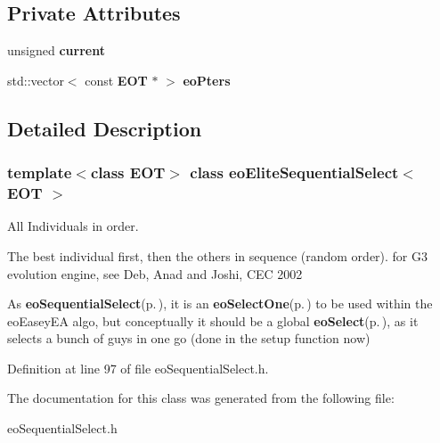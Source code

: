 \subsection*{Private Attributes}
\begin{CompactItemize}
\item 
unsigned {\bf current}\label{classeo_elite_sequential_select_r0}

\item 
std::vector$<$ const {\bf EOT} $\ast$ $>$ {\bf eo\-Pters}\label{classeo_elite_sequential_select_r1}

\end{CompactItemize}


\subsection{Detailed Description}
\subsubsection*{template$<$class EOT$>$ class eo\-Elite\-Sequential\-Select$<$ EOT $>$}

All Individuals in order. 

The best individual first, then the others in sequence (random order). for G3 evolution engine, see Deb, Anad and Joshi, CEC 2002

As {\bf eo\-Sequential\-Select}{\rm (p.\,\pageref{classeo_sequential_select})}, it is an {\bf eo\-Select\-One}{\rm (p.\,\pageref{classeo_select_one})} to be used within the eo\-Easey\-EA algo, but conceptually it should be a global {\bf eo\-Select}{\rm (p.\,\pageref{classeo_select})}, as it selects a bunch of guys in one go (done in the setup function now) 



Definition at line 97 of file eo\-Sequential\-Select.h.

The documentation for this class was generated from the following file:\begin{CompactItemize}
\item 
eo\-Sequential\-Select.h\end{CompactItemize}
